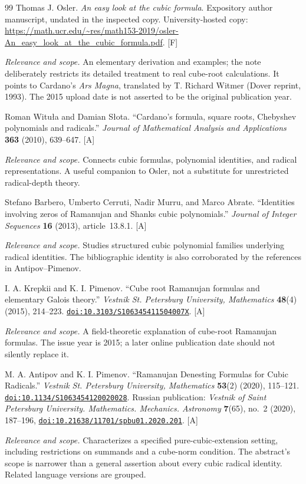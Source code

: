 \documentclass[11pt,letterpaper]{article}
\numberwithin{equation}{section}
\theoremstyle{definition}
\theoremstyle{remark}
\newcommand{\doi}[1]{\href{https://doi.org/#1}{\nolinkurl{doi:#1}}}
\newcommand{\status}[1]{\textsf{\small[#1]}}
\newcommand{\entrynote}[1]{\par\smallskip\noindent\emph{Relevance and scope.} #1}
\begin{document}
\begin{thebibliography}{99}
Thomas J. Osler. \emph{An easy look at the cubic formula}. Expository author manuscript, undated in the inspected copy. University-hosted copy: \url{https://math.ucr.edu/~res/math153-2019/osler-An_easy_look_at_the_cubic_formula.pdf}. \status{F}
\entrynote{An elementary derivation and examples; the note deliberately restricts its detailed treatment to real cube-root calculations. It points to Cardano's \emph{Ars Magna}, translated by T. Richard Witmer (Dover reprint, 1993). The 2015 upload date is not asserted to be the original publication year.}

Roman Witu\l a and Damian S\l ota. ``Cardano's formula, square roots, Chebyshev polynomials and radicals.'' \emph{Journal of Mathematical Analysis and Applications} \textbf{363} (2010), 639--647. \status{A}
\entrynote{Connects cubic formulas, polynomial identities, and radical representations. A useful companion to Osler, not a substitute for unrestricted radical-depth theory.}

Stefano Barbero, Umberto Cerruti, Nadir Murru, and Marco Abrate. ``Identities involving zeros of Ramanujan and Shanks cubic polynomials.'' \emph{Journal of Integer Sequences} \textbf{16} (2013), article~13.8.1. \status{A}
\entrynote{Studies structured cubic polynomial families underlying radical identities. The bibliographic identity is also corroborated by the references in Antipov--Pimenov.}

I. A. Krepkii and K. I. Pimenov. ``Cube root Ramanujan formulas and elementary Galois theory.'' \emph{Vestnik St. Petersburg University, Mathematics} \textbf{48}(4) (2015), 214--223. \doi{10.3103/S106345411504007X}. \status{A}
\entrynote{A field-theoretic explanation of cube-root Ramanujan formulas. The issue year is 2015; a later online publication date should not silently replace it.}

M. A. Antipov and K. I. Pimenov. ``Ramanujan Denesting Formulas for Cubic Radicals.'' \emph{Vestnik St. Petersburg University, Mathematics} \textbf{53}(2) (2020), 115--121. \doi{10.1134/S1063454120020028}. Russian publication: \emph{Vestnik of Saint Petersburg University. Mathematics. Mechanics. Astronomy} \textbf{7}(65), no.~2 (2020), 187--196, \doi{10.21638/11701/spbu01.2020.201}. \status{A}
\entrynote{Characterizes a specified pure-cubic-extension setting, including restrictions on summands and a cube-norm condition. The abstract's scope is narrower than a general assertion about every cubic radical identity. Related language versions are grouped.}


\end{thebibliography}
\end{document}

